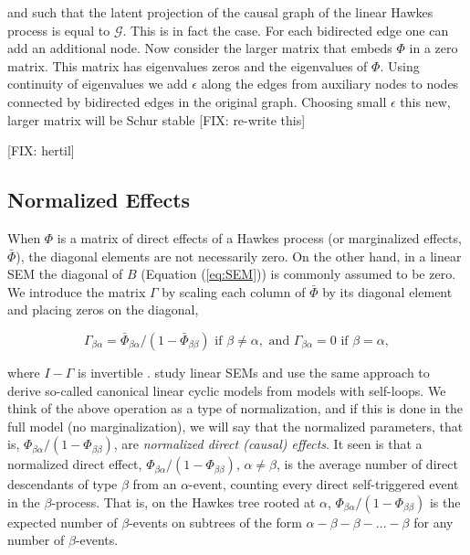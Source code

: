 \documentclass[accepted]{uai2021} %
\begin{document}
		and such that the latent projection of the causal graph of the linear 
		Hawkes process is equal to $\mathcal{G}$. This is in fact the case. For 
		each bidirected edge one can add an additional node. Now consider the 
		larger matrix that embeds $\Phi$ in a zero matrix. This matrix has 
		eigenvalues zeros and the eigenvalues of $\Phi$. Using continuity of 
		eigenvalues we add $\epsilon$ along the edges from auxiliary nodes to 
		nodes connected by bidirected edges in the original graph. Choosing 
		small $\epsilon$ this new, larger matrix will be Schur stable [FIX: 
		re-write this]
		
		[FIX: hertil]
	

\subsection{Normalized Effects}
\label{sssec:normEff}

When $\Phi$ is a matrix of direct effects of a Hawkes process (or marginalized 
effects, $\bar{\Phi}$), the diagonal 
elements are not necessarily zero. On the other hand, in a linear SEM the 
diagonal of $B$ 
(Equation (\ref{eq:SEM})) is commonly assumed to be zero. We introduce 
the matrix $\Gamma$ by scaling each column of $\bar{\Phi}$ by its 
diagonal element and placing zeros on the diagonal,

$$
\Gamma_{\beta\alpha} = 
\bar{\Phi}_{\beta\alpha}/(1-\bar{\Phi}_{\beta\beta})  \text{ 
	if } \beta\neq \alpha, \text{ and } 
\Gamma_{\beta\alpha} 
= 0 \text{ if } \beta= \alpha,
$$

where $I-\Gamma$ is invertible \cite{hyttinen2012}. \cite{hyttinen2012} 
study linear SEMs and use the same approach to derive 
so-called canonical linear 
cyclic models from models with self-loops. We think of the above operation as a 
type of normalization, and if this is done in the full model (no 
marginalization), we 
will say that the normalized parameters, that is, 
${\Phi}_{\beta\alpha}/(1-{\Phi}_{\beta\beta}) $,
are \emph{normalized direct
	(causal) effects}. It seen is that a normalized direct effect, 
${\Phi}_{\beta\alpha}/(1-{\Phi}_{\beta\beta}) $, $\alpha\neq\beta$, is the 
average number of 
direct 
descendants of type 
$\beta$ from an $\alpha$-event, counting every direct self-triggered event in 
the $\beta$-process. 
That is, on the Hawkes tree rooted at $\alpha$, 
${\Phi}_{\beta\alpha}/(1-{\Phi}_{\beta\beta}) $ is 
the expected number of $\beta$-events on subtrees of the form $\alpha - \beta - 
\beta - \ldots - 
\beta$ for any number of $\beta$-events. 
\end{document}
